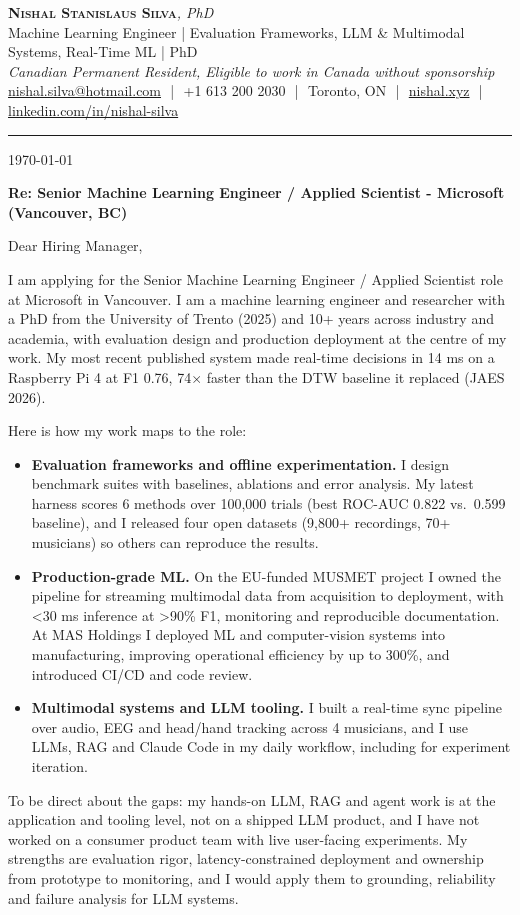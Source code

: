\documentclass[11pt]{article}
\makeatletter
\newcommand{\clName}{Nishal Stanislaus Silva}
\newcommand{\clEmail}{nishal.silva@hotmail.com}
\newcommand{\clPhone}{+1 613 200 2030}
\newcommand{\clCity}{Toronto, ON}
\newcommand{\clSite}{https://nishal.xyz}
\newcommand{\clLinkedIn}{https://www.linkedin.com/in/nishal-silva}
\newcommand{\clStatus}{Canadian Permanent Resident, Eligible to work in Canada without sponsorship}
\newcommand{\clTagline}{Machine Learning Engineer | Evaluation Frameworks, LLM \& Multimodal Systems, Real-Time ML | PhD}
\newcommand{\clRole}{Senior Machine Learning Engineer / Applied Scientist}
\newcommand{\clCompany}{Microsoft}
\newcommand{\clAddressee}{Dear Hiring Manager,}
\makeatother
\begin{document}
\pagestyle{empty}

\begin{center}
    {\LARGE \scshape \textbf{\clName}}{\large \textit{, PhD}}
    \\[1pt]
    {\small \clTagline}
    \\[1pt]
    {\footnotesize\textit{\clStatus}}
    \\[1pt]
    {\small
    \href{mailto:\clEmail}{\clEmail}
    \,\,|\,\, \clPhone
    \,\,|\,\, \clCity
    \,\,|\,\, \href{\clSite}{nishal.xyz}
    \,\,|\,\, \href{\clLinkedIn}{linkedin.com/in/nishal-silva}}
\end{center}

\rule{\linewidth}{0.4pt}\vspace{0.6em}

\today

\textbf{Re: \clRole{} - \clCompany{} (Vancouver, BC)}

\clAddressee

I am applying for the \clRole{} role at \clCompany{} in Vancouver. I am a machine learning engineer and researcher with a PhD from the University of Trento (2025) and 10+ years across industry and academia, with evaluation design and production deployment at the centre of my work. My most recent published system made real-time decisions in 14 ms on a Raspberry Pi 4 at F1 0.76, 74$\times$ faster than the DTW baseline it replaced (JAES 2026).

Here is how my work maps to the role:
\begin{itemize}[leftmargin=1.4em, itemsep=0.1em, topsep=0.2em]
    \item \textbf{Evaluation frameworks and offline experimentation.} I design benchmark suites with baselines, ablations and error analysis. My latest harness scores 6 methods over 100,000 trials (best ROC-AUC 0.822 vs.\ 0.599 baseline), and I released four open datasets (9,800+ recordings, 70+ musicians) so others can reproduce the results.
    \item \textbf{Production-grade ML.} On the EU-funded MUSMET project I owned the pipeline for streaming multimodal data from acquisition to deployment, with <30 ms inference at >90\% F1, monitoring and reproducible documentation. At MAS Holdings I deployed ML and computer-vision systems into manufacturing, improving operational efficiency by up to 300\%, and introduced CI/CD and code review.
    \item \textbf{Multimodal systems and LLM tooling.} I built a real-time sync pipeline over audio, EEG and head/hand tracking across 4 musicians, and I use LLMs, RAG and Claude Code in my daily workflow, including for experiment iteration.
\end{itemize}
To be direct about the gaps: my hands-on LLM, RAG and agent work is at the application and tooling level, not on a shipped LLM product, and I have not worked on a consumer product team with live user-facing experiments. My strengths are evaluation rigor, latency-constrained deployment and ownership from prototype to monitoring, and I would apply them to grounding, reliability and failure analysis for LLM systems.
\end{document}
